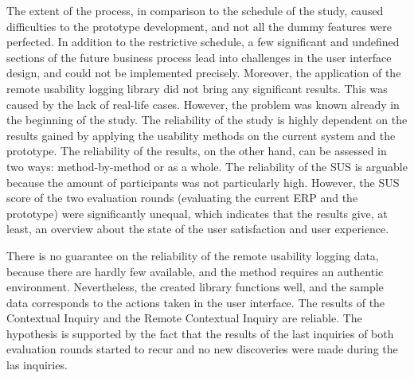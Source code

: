 \documentclass[12pt,a4paper,oneside,pdftex]{report}
\begin{document}
The extent of the process, in comparison to the schedule of the study, caused difficulties to the prototype development, and not all the dummy features were perfected. In addition to the restrictive schedule, a few significant and undefined sections of the future business process lead into challenges in the user interface design, and could not be implemented precisely. Moreover, the application of the remote usability logging library did not bring any significant results. This was caused by the lack of real-life cases. However, the problem was known already in the beginning of the study.
The reliability of the study is highly dependent on the results gained by applying the usability methods on the current system and the prototype. The reliability of the results, on the other hand, can be assessed in two ways: method-by-method or as a whole. The reliability of the SUS is arguable because the amount of participants was not particularly high. However, the SUS score of the two evaluation rounds (evaluating the current ERP and the prototype) were significantly unequal, which indicates that the results give, at least, an overview about the state of the user satisfaction and user experience. 

There is no guarantee on the reliability of the remote usability logging data, because there are hardly few available, and the method requires an authentic environment. Nevertheless, the created library functions well, and the sample data corresponds to the actions taken in the user interface. The results of the Contextual Inquiry and the Remote Contextual Inquiry are reliable. The hypothesis is supported by the fact that the results of the last inquiries of both evaluation rounds started to recur and no new discoveries were made during the las inquiries. 
\end{document}
